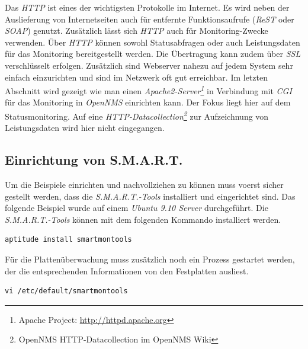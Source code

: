 Das \emph{HTTP} ist eines der wichtigsten Protokolle im Internet. Es wird neben der Auslieferung von Internetseiten auch für entfernte Funktionsaufrufe (\emph{ReST} oder \emph{SOAP}) genutzt. Zusätzlich lässt sich \emph{HTTP} auch für Monitoring-Zwecke verwenden. Über \emph{HTTP} können sowohl Statusabfragen oder auch Leistungsdaten für das Monitoring bereitgestellt werden. Die Übertragung kann zudem über \emph{SSL} verschlüsselt erfolgen. Zusätzlich sind Webserver nahezu auf jedem System sehr einfach einzurichten und sind im Netzwerk oft gut erreichbar. Im letzten Abschnitt wird gezeigt wie man einen \emph{Apache2-Server\footnote{Apache Project: \url{http://httpd.apache.org}}} in Verbindung mit \emph{CGI} für das Monitoring in \emph{OpenNMS} einrichten kann. Der Fokus liegt hier auf dem Statusmonitoring. Auf eine \emph{HTTP-Datacollection\footnote{OpenNMS HTTP-Datacollection im OpenNMS Wiki}} zur Aufzeichnung von Leistungsdaten wird hier nicht eingegangen.

\subsection{Einrichtung von S.M.A.R.T.}
Um die Beispiele einrichten und nachvollziehen zu können muss voerst sicher gestellt werden, dass die \emph{S.M.A.R.T.-Tools} installiert und eingerichtet sind. Das folgende Beispiel wurde auf einem \emph{Ubuntu 9.10 Server} durchgeführt. Die \emph{S.M.A.R.T.-Tools} können mit dem folgenden Kommando installiert werden.

\begin{lstlisting}[numbers=none]
aptitude install smartmontools
\end{lstlisting}

Für die Plattenüberwachung muss zusätzlich noch ein Prozess gestartet werden, der die entsprechenden Informationen von den Festplatten ausliest.

\begin{lstlisting}[numbers=none]
vi /etc/default/smartmontools
\end{lstlisting}

